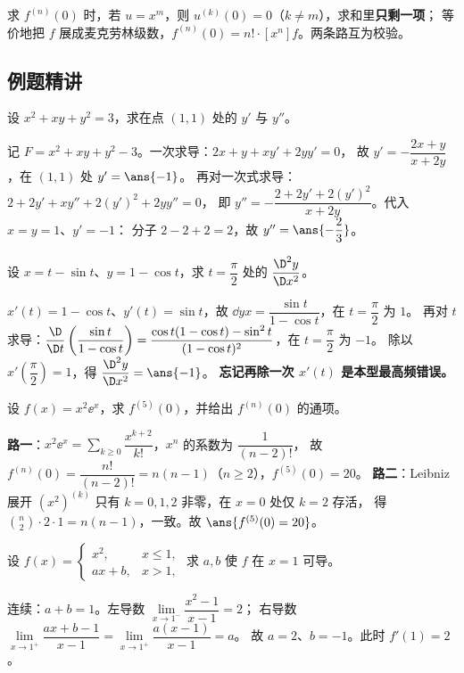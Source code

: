 \begin{keypoint}
求 $f^{(n)}(0)$ 时，若 $u=x^m$，则 $u^{(k)}(0)=0$（$k\ne m$），求和里\textbf{只剩一项}；
等价地把 $f$ 展成麦克劳林级数，$f^{(n)}(0)=n!\cdot[x^n]f$。两条路互为校验。
\end{keypoint}

\subsection{例题精讲}

\begin{exa}[隐函数二阶导]
设 $x^2+xy+y^2=3$，求在点 $(1,1)$ 处的 $y'$ 与 $y''$。
\end{exa}
\begin{solution}
记 $F=x^2+xy+y^2-3$。一次求导：$2x+y+xy'+2yy'=0$，
故 $y'=-\dfrac{2x+y}{x+2y}$，在 $(1,1)$ 处 $y'=\ans{-1}$。
再对一次式求导：$2+2y'+xy''+2(y')^2+2yy''=0$，
即 $y''=-\dfrac{2+2y'+2(y')^2}{x+2y}$。代入 $x=y=1$、$y'=-1$：
分子 $2-2+2=2$，故 $y''=\ans{-\dfrac23}$。
\end{solution}

\begin{exa}[参数方程二阶导]
设 $x=t-\sin t$、$y=1-\cos t$，求 $t=\dfrac\pi2$ 处的 $\dfrac{\D^2y}{\D x^2}$。
\end{exa}
\begin{solution}
$x'(t)=1-\cos t$、$y'(t)=\sin t$，故 $\dd{y}{x}=\dfrac{\sin t}{1-\cos t}$，在 $t=\dfrac\pi2$ 为 $1$。
再对 $t$ 求导：$\dfrac{\D}{\D t}\left(\dfrac{\sin t}{1-\cos t}\right)
=\dfrac{\cos t(1-\cos t)-\sin^2 t}{(1-\cos t)^2}$，在 $t=\dfrac\pi2$ 为 $-1$。
除以 $x'\left(\dfrac\pi2\right)=1$，得 $\dfrac{\D^2y}{\D x^2}=\ans{-1}$。
\textbf{忘记再除一次 $x'(t)$ 是本型最高频错误。}
\end{solution}

\begin{exa}
设 $f(x)=x^2\ee^x$，求 $f^{(5)}(0)$，并给出 $f^{(n)}(0)$ 的通项。
\end{exa}
\begin{solution}
\textbf{路一}：$x^2\ee^x=\sum\limits_{k\ge0}\dfrac{x^{k+2}}{k!}$，$x^n$ 的系数为 $\dfrac{1}{(n-2)!}$，
故 $f^{(n)}(0)=\dfrac{n!}{(n-2)!}=n(n-1)$（$n\ge2$），$f^{(5)}(0)=20$。
\textbf{路二}：Leibniz 展开 $(x^2)^{(k)}$ 只有 $k=0,1,2$ 非零，在 $x=0$ 处仅 $k=2$ 存活，
得 $\binom n2\cdot2\cdot1=n(n-1)$，一致。故 $\ans{f^{(5)}(0)=20}$。
\end{solution}

\begin{exa}[分段可导求参数]
设 $f(x)=\begin{cases}x^2,&x\le1,\\ ax+b,&x>1,\end{cases}$ 求 $a,b$ 使 $f$ 在 $x=1$ 可导。
\end{exa}
\begin{solution}
连续：$a+b=1$。左导数 $\lim\limits_{x\to1^-}\dfrac{x^2-1}{x-1}=2$；
右导数 $\lim\limits_{x\to1^+}\dfrac{ax+b-1}{x-1}=\lim\limits_{x\to1^+}\dfrac{a(x-1)}{x-1}=a$。
故 $a=2$、$b=-1$。此时 $f'(1)=2$。
\end{solution}

